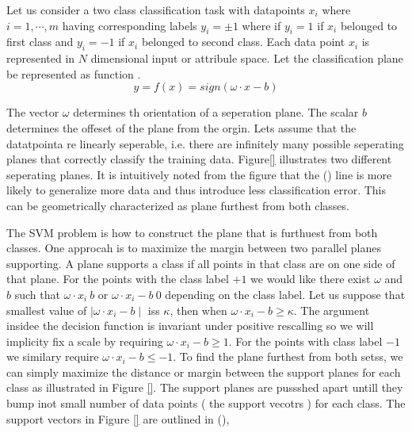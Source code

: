 Let us consider  a two class classification task with datapoints $x_i$ where $i=1,\cdots,m$ having corresponding labels $y_i=\pm1$ where if  $y_i=1$ if $x_i$ belonged to first class and $y_i=-1$ if $x_i$ belonged to second class. Each data  point $x_i$ is represented in $N$ dimensional input or attribule space. Let the classification plane be represented as function . 
\begin{equation}
 y=f(x)=sign(\omega \cdot x - b)
\label{eq:planeEq}
\end{equation}

 The vector $\omega$ determines th orientation of a seperation plane. The scalar $b$ determines the offeset of the plane from the orgin. Lets assume that the datatpointa re linearly seperable, i.e. there are infinitely many possible seperating planes that correctly classify the training data. Figure\ref{} illustrates two different seperating planes. It is intuitively noted from the figure that the () line is more likely to generalize more data and thus introduce less classification error. This can be geometrically characterized as plane furthest from both classes.     %

The SVM problem is how to construct the plane that is furthuest from both classes. One approcah is to maximize the margin between two parallel planes supporting. A plane supports a class if all points in that class are on one side of that plane. For the points with the class label $+1$ we would like there exist $\omega$ and $b$ such that $\omega \cdot x_i\> b$ or $\omega \cdot x_i -b \> 0$  depending on the class label. Let us suppose that smallest value of $\mid \omega \cdot x_i -b\mid$ iss $\kappa$, then when $ \omega \cdot x_i -b \geq \kappa$. The argument insidee the decision function is invariant under positive rescalling so we will implicity fix a scale by requiring $\omega \cdot x_i -b \geq 1 $. For the points with class label $-1$ we similary require $\omega \cdot x_i -b \leq -1 $. To find the plane furthest from both setss, we can simply maximize the distance or margin between the support planes for each class as illustrated in Figure \ref{}. The support planes are pussshed apart untill they bump inot small number of data points ( the support vecotrs ) for each class. The support vectors in Figure \ref{} are outlined in (), 


